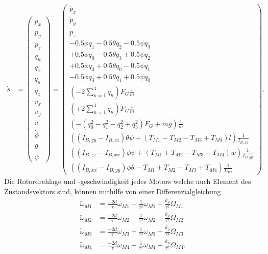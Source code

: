 \begin{align}\label{zustandsvektor:zustandsvektor}
	\dot{s} &= 
	\begin{pmatrix}
		\dot{p}_x\\
		\dot{p}_y\\
		\dot{p}_z\\
		\dot{q}_w\\
		\dot{q}_x\\
		\dot{q}_y\\
		\dot{q}_z\\
		\dot{v}_x\\
		\dot{v}_y\\
		\dot{v}_z\\
		\dot{\phi}\\
		\dot{\theta}\\
		\dot{\psi}
	\end{pmatrix} = 
	\begin{pmatrix}
		\dot{p}_x\\
		\dot{p}_y\\
		\dot{p}_z\\
		-0.5\phi q_1 - 0.5\theta q_2 - 0.5\psi q_3\\
		+0.5\phi q_0 - 0.5\theta q_3 + 0.5\psi q_2\\
		+0.5\phi q_3 + 0.5\theta q_0 - 0.5\psi q_1\\
		-0.5\phi q_3 + 0.5\theta q_1 + 0.5\psi q_0\\
		(-2 \sum_{n=1}^4{q_n}) F_G \frac{1}{m}\\
		(+2 \sum_{n=1}^4{q_n}) F_G \frac{1}{m}\\
		(-(q_0^2-q_1^2-q_2^2+q_3^2) F_G + mg) \frac{1}{m}\\
		((I_{B,yy} - I_{B,zz}) \theta \psi + (T_{M1} - T_{M2} - T_{M3} + T_{M4}) l) \frac{1}{I_{B,xx}}\\
		((I_{B,zz} - I_{B,xx}) \phi \psi + (T_{M1} + T_{M2} - T_{M3} - T_{M4}) w) \frac{1}{I_{B,yy}}\\
		((I_{B,xx} - I_{B,yy}) \phi \theta - T_{M1} + T_{M2} - T_{M3} + T_{M4})\frac{1}{I_{Bzz}}
	\end{pmatrix}.
\end{align}
Die Rotordrehlage und -geschwindigkeit jedes Motors welche auch Element des Zustandsvektors sind, können mithilfe von einer Differenzialgleichung
\begin{align}
	\ddot{\omega}_{M1} &= \frac{-2d}{\tau}\dot{\omega}_{M1} - \frac{1}{\tau^2}\omega_{M1} + \frac{k_p}{\tau^2}\Omega_{M1}\\
	\ddot{\omega}_{M2} &= \frac{-2d}{\tau}\dot{\omega}_{M2} - \frac{1}{\tau^2}\omega_{M2} + \frac{k_p}{\tau^2}\Omega_{M2}\\
	\ddot{\omega}_{M3} &= \frac{-2d}{\tau}\dot{\omega}_{M3} - \frac{1}{\tau^2}\omega_{M3} + \frac{k_p}{\tau^2}\Omega_{M3}\\
	\ddot{\omega}_{M4} &= \frac{-2d}{\tau}\dot{\omega}_{M4} - \frac{1}{\tau^2}\omega_{M4} + \frac{k_p}{\tau^2}\Omega_{M4}.
\end{align}

